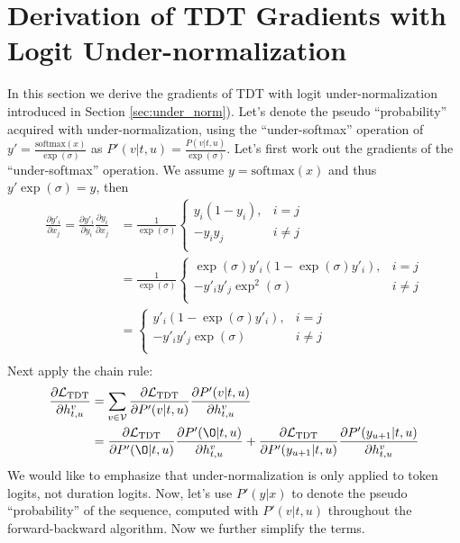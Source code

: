 \documentclass{article}
\begin{document}
\section{Derivation of TDT Gradients with Logit Under-normalization}
In this section we derive the gradients of TDT with logit under-normalization introduced in Section \ref{sec:under_norm}). 
Let's denote the pseudo ``probability'' acquired with under-normalization, using the ``under-softmax'' operation of $y' = \frac{\text{softmax}(x)}{\exp(\sigma)}$ as $P'(v | t, u) = \frac{P(v | t, u)}{\exp(\sigma)}$. Let's first work out the gradients of the ``under-softmax'' operation. We assume $y = \text{softmax}(x)$ and thus $y' \exp(\sigma) = y$, then
\begin{equation}
\begin{aligned}
    \frac{\partial y'_i}{\partial x_j} = \frac{\partial y'_i}{\partial y_i} \frac{\partial y_i}{\partial x_j} & = \frac{1}{\exp(\sigma)} \begin{cases}
    y_i (1 - y_i), & i = j \\
    -y_i  y_j & i \neq j \\
    \end{cases} \\
    & = \frac{1}{\exp(\sigma)} \begin{cases}
    \exp(\sigma) y'_i (1 - \exp(\sigma) y'_i), & i = j \\
    -y'_i  y'_j \exp^2(\sigma)& i \neq j \\
    \end{cases} \\
    & = \begin{cases}
    y'_i (1 - \exp(\sigma) y'_i), & i = j \\
    -y'_i  y'_j \exp(\sigma)& i \neq j \\
    \end{cases} \\
\end{aligned}
\end{equation}
Next apply the chain rule:
\begin{align}
\label{sigma_chainrule}
\begin{aligned}
\frac{\partial{\mathcal{L}_\text{TDT}}}{\partial{h_{t, u}^v}} &= \sum_{v \in \mathcal{V}  } \frac{\partial{\mathcal{L}_\text{TDT}}}{\partial{P'(v| t, u)}} \frac{\partial{P'(v| t, u)}}{\partial{h_{t, u}^v}}  \\
    & = \frac{\partial{\mathcal{L}_\text{TDT}}}{\partial{P'(\O| t, u)}} \frac{\partial{P'(\O| t, u)}}{\partial{h_{t, u}^v}} + \frac{\partial{\mathcal{L}_\text{TDT}}}{\partial{P'(y_{u+1}| t, u)}} \frac{\partial{P'(y_{u+1}| t, u)}}{\partial{h_{t, u}^v}}
\end{aligned}
\end{align}
We would like to emphasize that under-normalization is only applied to token logits, not duration logits. 
Now, let's use $P'(y|x)$ to denote the pseudo ``probability'' of the sequence, computed with $P'(v|t,u)$ throughout the forward-backward algorithm. Now we further simplify the terms. 
\end{document}
